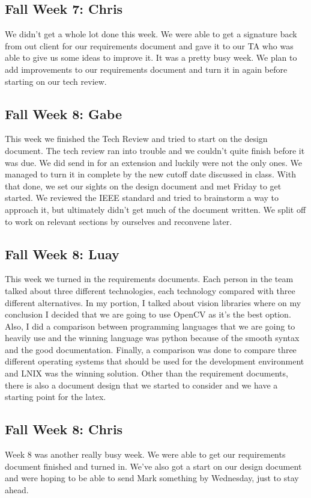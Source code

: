 \documentclass[onecolumn, draftclsnofoot,10pt, compsoc]{IEEEtran}
\begin{document}
\subsection{Fall Week 7: Chris}
We didn't get a whole lot done this week. We were able to get a signature back from out client for our requirements document and gave it to our TA who was able to give us some ideas to improve it. It was a pretty busy week. We plan to add improvements to our requirements document and turn it in again before starting on our tech review.
\subsection{Fall Week 8: Gabe}
This week we finished the Tech Review and tried to start on the design document. The tech review ran into trouble and we couldn't quite finish before it was due. We did send in for an extension and luckily were not the only ones. We managed to turn it in complete by the new cutoff date discussed in class. With that done, we set our sights on the design document and met Friday to get started. We reviewed the IEEE standard and tried to brainstorm a way to approach it, but ultimately didn't get much of the document written. We split off to work on relevant sections by ourselves and reconvene later.
\subsection{Fall Week 8: Luay}
This week we turned in the requirements documents. Each person in the team talked about three different technologies, each technology compared with three different alternatives. In my portion, I talked about vision libraries where on my conclusion I decided that we are going to use OpenCV as it’s the best option. Also, I did a comparison between programming languages that we are going to heavily use and the winning language was python because of the smooth syntax and the good documentation. Finally, a comparison was done to compare three different operating systems that should be used for the development environment and LNIX was the winning solution. Other than the requirement documents, there is also a document design that we started to consider and we have a starting point for the latex.
\subsection{Fall Week 8: Chris}
Week 8 was another really busy week. We were able to get our requirements document finished and turned in. We've also got a start on our design document and were hoping to be able to send Mark something by Wednesday, just to stay ahead.
\end{document}

